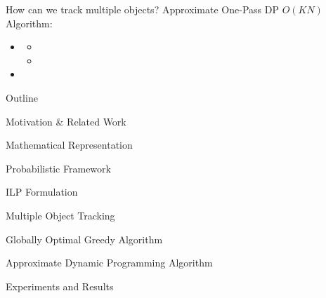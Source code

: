 \documentclass[aspectratio=43]{beamer}
\begin{document}
		\begin{frame}{How can we track multiple objects?}
			Approximate One-Pass DP $O(KN)$ Algorithm:
			\begin{itemize}
				\item {}
				\begin{itemize}
					\item {}
					\item {}
				\end{itemize}
				\item {}
			\end{itemize}
		\end{frame}
		
		\begin{frame}{Outline}
			\begin{itemize}
				{\color{gray}
					\item Motivation \& Related Work
					\item Mathematical Representation
				}
				\begin{itemize}
					{\color{gray}
						\item Probabilistic Framework
						\item ILP Formulation
					}
				\end{itemize}
				{\color{gray} \item Multiple Object Tracking }
				\begin{itemize}
					{\color{gray}
						\item Globally Optimal Greedy Algorithm
						\item Approximate Dynamic Programming Algorithm
					}
				\end{itemize}
				\item Experiments and Results
			\end{itemize}
		\end{frame}
		
\end{document}

